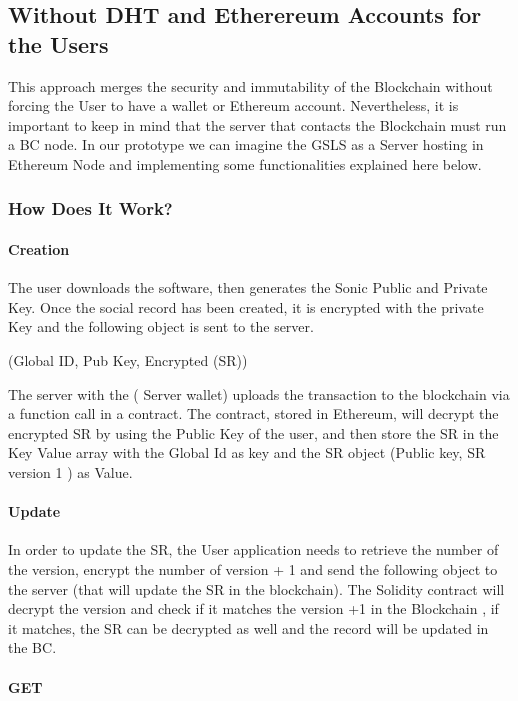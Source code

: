 \subsection{Without DHT and Etherereum Accounts for the Users}
This approach merges the security and immutability of the Blockchain without forcing the User to have a wallet or Ethereum account. Nevertheless, it is important to keep in mind that the server that contacts the Blockchain must run a BC node. In our prototype we can imagine the GSLS as a Server hosting in Ethereum Node and implementing some functionalities explained here below.

\subsubsection{How Does It Work?}

\paragraph{Creation}

The user downloads the software, then generates the Sonic Public and Private Key. Once the social record has been created, it is encrypted with the private Key and the following object is sent to the server.

(Global ID, Pub Key, Encrypted (SR))

The server with the ( Server wallet) uploads the transaction to the blockchain via a function call in a contract. The contract, stored in Ethereum, will decrypt the encrypted SR by using the Public Key of the user,  and then store the SR in the Key Value array with the Global Id as key and the SR object (Public key, SR version 1 ) as Value.

\paragraph{Update}

In order to update the SR, the User application needs to retrieve the number of the version, encrypt the number of version + 1 and send the following object to the server (that will update the SR in the blockchain). The Solidity contract will decrypt the version and check if it matches the version +1 in the Blockchain , if it matches, the SR can be decrypted as well and the record will be updated in the BC.

\paragraph{GET}

